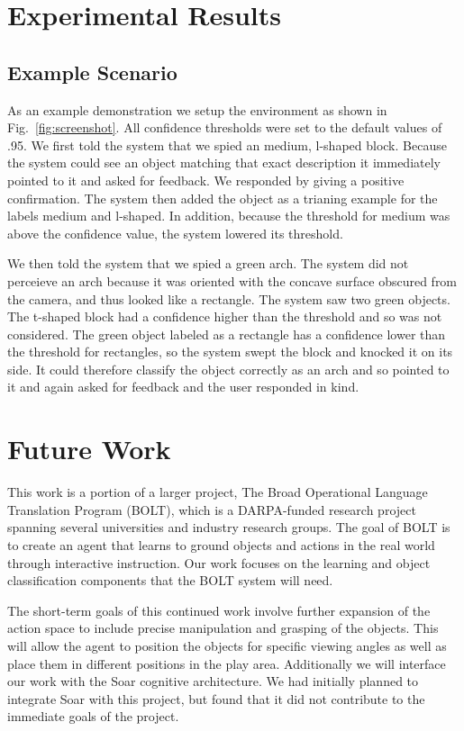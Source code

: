 \documentclass[11pt]{article}
\begin{document}
\section{Experimental Results}

\subsection{Example Scenario}
\label{sec:scenario}
As an example demonstration we setup the environment as shown in Fig.~\ref{fig:screenshot}. All confidence thresholds were set to the default values of .95. We first told the system that we spied an medium, l-shaped block. Because the system could see an object matching that exact description it immediately pointed to it and asked for feedback. We responded by giving a positive confirmation. The system then added the object as a trianing example for the labels medium and l-shaped. In addition, because the threshold for medium was above the confidence value, the system lowered its threshold. 

We then told the system that we spied a green arch. The system did not perceieve an arch because it was oriented with the concave surface obscured from the camera, and thus looked like a rectangle. The system saw two green objects. The t-shaped block had a confidence higher than the threshold and so was not considered. The green object labeled as a rectangle has a confidence lower than the threshold for rectangles, so the system swept the block and knocked it on its side. It could therefore classify the object correctly as an arch and so pointed to it and again asked for feedback and the user responded in kind.

\section{Future Work}
\label{sec:future-work}
This work is a portion of a larger project, The Broad Operational Language
Translation Program (BOLT), which is a DARPA-funded research project spanning several
universities and industry research groups. The goal of BOLT is to create an
agent that learns to ground objects and actions in the real world through
interactive instruction. Our work focuses on the learning and object
classification components that the BOLT system will need.

The short-term goals of this continued work involve further expansion of the
action space to include precise manipulation and grasping of the objects. This
will allow the agent to position the objects for specific viewing angles as
well as place them in different positions in the play area. Additionally we will
interface our work with the Soar cognitive architecture. We had initially planned to
integrate Soar with this project, but found that it did not contribute
to the immediate goals of the project.
\end{document}
